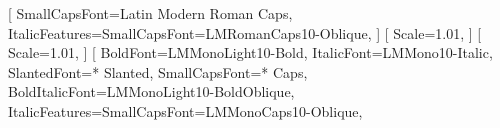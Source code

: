 \usepackage{lmodern}%
\usepackage[warnings-off={mathtools-colon,mathtools-overbracket}]{unicode-math}%
%
\usepackage{fontspec}%
\newcommand{\DenKrFontEngine}{fontspec}%
\setmainfont{Latin Modern Roman}[%
	SmallCapsFont={Latin Modern Roman Caps},%
	ItalicFeatures={SmallCapsFont=LMRomanCaps10-Oblique},%
]%
\setmainfont{LinuxLibertine O}[%
	Scale=1.01,%
]%
\setsansfont{Linux Biolinum O}[%
	Scale=1.01,%
]%
\setmonofont{Latin Modern Mono}[%
	BoldFont={LMMonoLight10-Bold},%
	ItalicFont={LMMono10-Italic},%
	SlantedFont={* Slanted},%
	SmallCapsFont={* Caps},%
	BoldItalicFont={LMMonoLight10-BoldOblique},%
	ItalicFeatures={SmallCapsFont=LMMonoCaps10-Oblique},%
